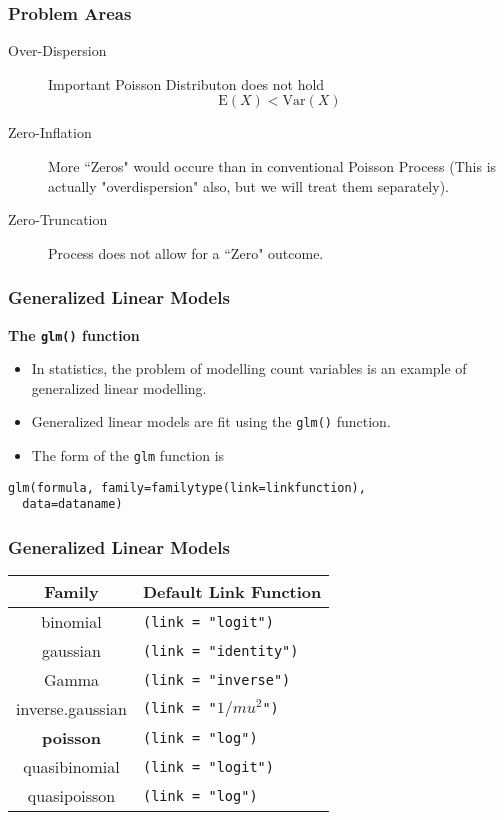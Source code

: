 \documentclass[MASTER.tex]{subfiles}
\begin{document}
\begin{frame}
\frametitle{Problem Areas}

\begin{description}
\item[Over-Dispersion] Important Poisson Distributon does not hold 
\[ \mathrm{E}(X)  < \mathrm{Var}(X) \]
\item[Zero-Inflation] More ``Zeros" would occure than in conventional Poisson Process (This is actually "overdispersion" also, but we will treat them separately).
\item[ Zero-Truncation] Process does not allow for a ``Zero" outcome. 
\end{description}
\end{frame}
\begin{frame}[fragile]
\frametitle{Generalized Linear Models}\large
\textbf{The \texttt{glm()} function}
\begin{itemize}
\item In statistics, the problem of modelling count variables is an example of generalized linear modelling.
\item Generalized linear models are fit using the \texttt{glm()} function. 
\item The form of the \texttt{glm} function is
\end{itemize}
{
\normalsize
\begin{framed}
 \begin{verbatim}
glm(formula, family=familytype(link=linkfunction),
  data=dataname)
\end{verbatim}
\end{framed}
}
\end{frame}
\begin{frame}[fragile]
	\frametitle{Generalized Linear Models}
	\large
\begin{center}
\begin{tabular}{|c|l|} \hline
	Family &	Default Link Function \\ \hline \hline 
	binomial&	\texttt{(link = "logit")} \\ \hline
	gaussian&	\texttt{(link = "identity")} \\ \hline
	Gamma&	\texttt{(link = "inverse")} \\ \hline
	inverse.gaussian&	\texttt{(link = "$1/mu^2$")} \\ \hline
	\textbf{poisson}	&\texttt{(link = "log")} \\ \hline
	quasibinomial&	\texttt{(link = "logit")} \\ \hline
	quasipoisson&	\texttt{(link = "log")} \\ \hline
	
\end{tabular}
\end{center}
 
\end{frame}
\end{document}

